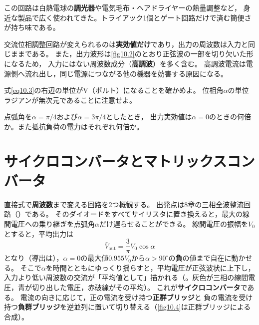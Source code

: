 この回路は白熱電球の\textbf{調光器}や電気毛布・ヘアドライヤーの熱量調整など，
身近な製品で広く使われてきた。トライアック1個とゲート回路だけで済む簡便さが持ち味である。

\begin{注意}
交流位相調整回路が変えられるのは\textbf{実効値だけ}であり，出力の周波数は入力と同じままである。
また，出力波形は\ref{fig10.2}のとおり正弦波の一部を切り欠いた形になるため，
入力にはない周波数成分（\textbf{高調波}）を多く含む。
高調波電流は電源側へ流れ出し，同じ電源につながる他の機器を妨害する原因になる。
\end{注意}

\begin{問}
\item 式\ref{eq10.3}の右辺の単位がV（ボルト）になることを確かめよ。
位相角$\alpha$の単位ラジアンが無次元であることに注意せよ。
\item 点弧角を$\alpha = \pi/4$および$\alpha = 3\pi/4$としたとき，
出力実効値は$\alpha = 0$のときの何倍か。また抵抗負荷の電力はそれぞれ何倍か。
\end{問}


\section{サイクロコンバータとマトリックスコンバータ}
\label{sec10.4}

直接式で\textbf{周波数}まで変える回路を2つ概観する。
出発点は8章の三相全波整流回路（）である。
そのダイオードをすべてサイリスタに置き換えると，最大の線間電圧への乗り継ぎを点弧角$\alpha$だけ遅らせることができる。
線間電圧の振幅を$V_0$とすると，平均出力は
\begin{equation}
\bar{V}_{\mathrm{out}} = \frac{3}{\pi} V_0 \cos\alpha
\label{eq10.4}
\end{equation}
となり（導出は），$\alpha = 0$の最大値$0.955 V_0$から$\alpha > 90^\circ$の\textbf{負}の値まで自在に動かせる。
そこで$\alpha$を時間とともにゆっくり揺らすと，平均電圧が正弦波状に上下し，
入力より低い周波数の交流が「平均値として」描かれる（。灰色が三相の線間電圧，青が切り出した電圧，赤破線がその平均）。
これが\textbf{サイクロコンバータ}である。
電流の向きに応じて，正の電流を受け持つ\textbf{正群ブリッジ}と
負の電流を受け持つ\textbf{負群ブリッジ}を逆並列に置いて切り替える（\ref{fig10.4}は正群ブリッジによる合成）。

